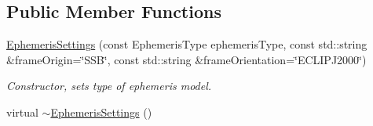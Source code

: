 \subsection*{Public Member Functions}
\begin{DoxyCompactItemize}
\item 
\hyperlink{classtudat_1_1simulation__setup_1_1EphemerisSettings_a7a92d768f7e34e35eb6be96f55dddd1b}{Ephemeris\+Settings} (const Ephemeris\+Type ephemeris\+Type, const std\+::string \&frame\+Origin=\char`\"{}S\+SB\char`\"{}, const std\+::string \&frame\+Orientation=\char`\"{}E\+C\+L\+I\+P\+J2000\char`\"{})
\begin{DoxyCompactList}\small\item\em Constructor, sets type of ephemeris model. \end{DoxyCompactList}\item 
virtual \hyperlink{classtudat_1_1simulation__setup_1_1EphemerisSettings_a5b9ede78f5a09f7abbefe2631bc6f4bc}{$\sim$\+Ephemeris\+Settings} ()\hypertarget{classtudat_1_1simulation__setup_1_1EphemerisSettings_a5b9ede78f5a09f7abbefe2631bc6f4bc}{}\label{classtudat_1_1simulation__setup_1_1EphemerisSettings_a5b9ede78f5a09f7abbefe2631bc6f4bc}


\end{DoxyCompactItemize}
